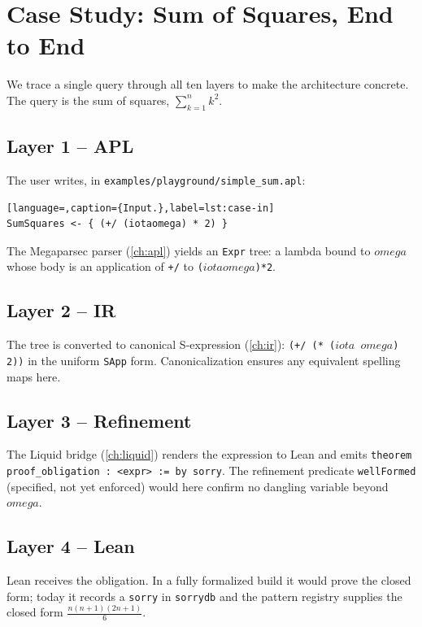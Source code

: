 \chapter{Case Study: Sum of Squares, End to End}
\label{ch:case}

We trace a single query through all ten layers to make the architecture
concrete. The query is the sum of squares, $\sum_{k=1}^{n} k^2$.

\section{Layer 1 -- APL}
\label{sec:case-l1}

The user writes, in \texttt{examples/playground/simple\_sum.apl}:
\begin{lstlisting}[language=,caption={Input.},label=lst:case-in]
SumSquares <- { (+/ (iotaomega) * 2) }
\end{lstlisting}
The Megaparsec parser (\cref{ch:apl}) yields an \texttt{Expr} tree: a lambda
bound to \texttt{\ensuremath{omega}} whose body is an application of \texttt{+/} to
\texttt{(\ensuremath{iota}\ensuremath{omega})*2}.

\section{Layer 2 -- IR}
\label{sec:case-l2}

The tree is converted to canonical S-expression (\cref{ch:ir}):
\texttt{(+/ (* (\ensuremath{iota} \ensuremath{omega}) 2))} in the uniform \texttt{SApp} form. Canonicalization
ensures any equivalent spelling maps here.

\section{Layer 3 -- Refinement}
\label{sec:case-l3}

The Liquid bridge (\cref{ch:liquid}) renders the expression to Lean and emits
\texttt{theorem proof\_obligation : <expr> := by sorry}. The refinement
predicate \texttt{wellFormed} (specified, not yet enforced) would here confirm
no dangling variable beyond \texttt{\ensuremath{omega}}.

\section{Layer 4 -- Lean}
\label{sec:case-l4}

Lean receives the obligation. In a fully formalized build it would prove the
closed form; today it records a \texttt{sorry} in \texttt{sorrydb} and the
pattern registry supplies the closed form $\frac{n(n+1)(2n+1)}{6}$.

